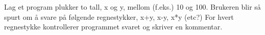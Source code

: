 %
%
Lag et program plukker to tall, x og y, mellom (f.eks.) 10 og 100. Brukeren blir så spurt om å svare på følgende regnestykker, x+y, x-y, x*y (etc?) For hvert regnestykke kontrollerer programmet svaret og skriver en kommentar.
